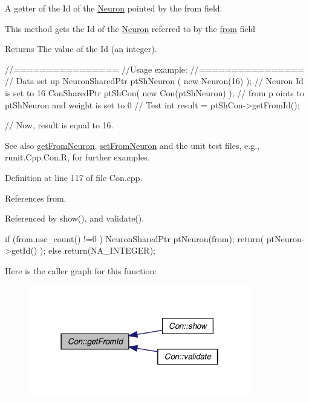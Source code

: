 A getter of the Id of the \hyperlink{class_neuron}{Neuron} pointed by the from field. 

This method gets the Id of the \hyperlink{class_neuron}{Neuron} referred to by the \hyperlink{class_con_a7c05f90dff56fd26c1fa0f042bba67a6}{from} field \begin{DoxyReturn}{Returns}
The value of the Id (an integer).
\end{DoxyReturn}

\begin{DoxyCode}
        //================
        //Usage example:
        //================
        // Data set up
                        NeuronSharedPtr ptShNeuron ( new Neuron(16) );  // Neuron
       Id is set to 16
                        ConSharedPtr ptShCon( new Con(ptShNeuron) );    // from p
      oints to ptShNeuron and weight is set to 0
        // Test
                        int result = ptShCon->getFromId();

        // Now, result is equal to 16.
\end{DoxyCode}


\begin{DoxySeeAlso}{See also}
\hyperlink{class_con_a93bb48dcfd631d4f6346e1b900bc3aa0}{getFromNeuron}, \hyperlink{class_con_a88d665801c38f923b61091f2b4d4c571}{setFromNeuron} and the unit test files, e.g., runit.Cpp.Con.R, for further examples. 
\end{DoxySeeAlso}


Definition at line 117 of file Con.cpp.



References from.



Referenced by show(), and validate().


\begin{DoxyCode}
                    {
        if (from.use_count() !=0 ){
                NeuronSharedPtr ptNeuron(from);
                return(  ptNeuron->getId() );
        } else {
                return(NA_INTEGER);
        }
}
\end{DoxyCode}


Here is the caller graph for this function:\nopagebreak
\begin{figure}[H]
\begin{center}
\leavevmode
\includegraphics[width=274pt]{class_con_aad72314592bebdcae6c68a67d2b4a505_icgraph}
\end{center}
\end{figure}


